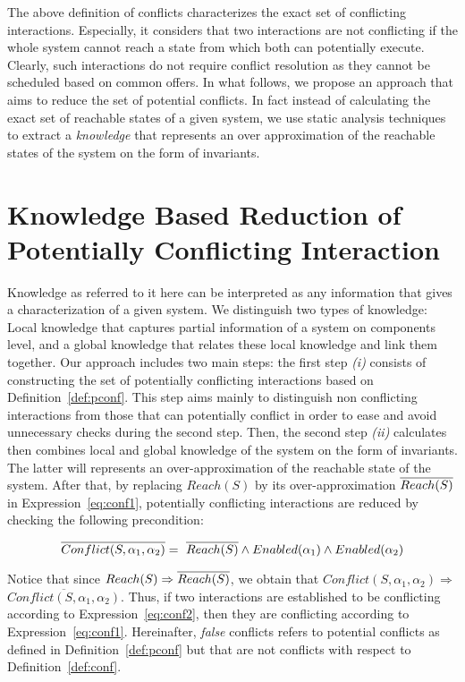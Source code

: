 The above definition of conflicts characterizes the exact set of conflicting interactions.
Especially, it considers that two interactions are not conflicting if the whole system
cannot reach a state from which both can potentially execute.
Clearly, such interactions do not require conflict resolution as they cannot be scheduled
based on common offers.
In what follows, we propose an approach that aims to reduce the set of potential conflicts.
In fact instead of calculating the exact set of reachable states of a given system,
we use static analysis techniques to extract a \emph{knowledge} that represents an
over approximation of the reachable states of the system on the form of invariants.

\section{Knowledge Based Reduction of Potentially Conflicting Interaction}

Knowledge as referred to it here can be interpreted as any information that gives 
a characterization of a given system. We distinguish two types of knowledge:
Local knowledge that captures partial information of a system on components level, and
a global knowledge that relates these local knowledge and link them together.
Our approach includes two main steps: the first step \emph{(i)} consists of constructing the set
of potentially conflicting interactions based on Definition~\ref{def:pconf}. 
This step aims mainly to distinguish non conflicting interactions from those that can
potentially conflict in order to ease and avoid unnecessary checks during the second step.
Then, the second step \emph{(ii)} calculates then combines local and global knowledge 
of the system on the form of invariants. The latter will represents an over-approximation 
of the reachable state of the system. 
After that, by replacing $Reach(S)$ by its over-approximation $\overline{Reach(S)}$ in
Expression~\ref{eq:conf1}, potentially conflicting interactions are reduced by
checking the following precondition:

\begin{equation}\label{eq:conf2}
  \overline{Conflict(S,\alpha_1,\alpha_2)}=\ \overline{Reach(S)} \wedge Enabled(\alpha_1) \wedge 
  Enabled(\alpha_2)
\end{equation}

Notice that since $Reach(S)\Rightarrow\overline{Reach(S)}$, we obtain that 
$Conflict(S,\alpha_1,\alpha_2) \Rightarrow$\\$\overline{Conflict(S,\alpha_1,\alpha_2)}$.
Thus, if two interactions are established to be conflicting  
according to Expression~\ref{eq:conf2}, then they are conflicting according to 
Expression~\ref{eq:conf1}.
Hereinafter, \emph{false} conflicts refers to potential conflicts as defined in
Definition~\ref{def:pconf} but that are not conflicts with respect to Definition~\ref{def:conf}.

